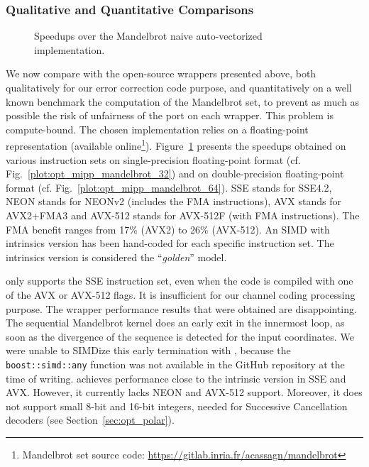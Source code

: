\subsubsection{Qualitative and Quantitative Comparisons}

\begin{figure}[htp]
  \centering
  \quad
  \caption{Speedups over the Mandelbrot naive auto-vectorized implementation.}
  \label{plot:opt_mipp_mandelbrot}
\end{figure}

We now compare \MIPP with the open-source wrappers presented above, both
qualitatively for our error correction code purpose, and quantitatively on a
well known benchmark the computation of the Mandelbrot set, to prevent as much
as possible the risk of unfairness of the port on each wrapper. This problem is
compute-bound. The chosen implementation relies on a floating-point
representation (available online\footnote{Mandelbrot set source code:
\url{https://gitlab.inria.fr/acassagn/mandelbrot}}).
Figure~\ref{plot:opt_mipp_mandelbrot} presents the speedups obtained on various
instruction sets on single-precision floating-point format (cf.
Fig.~\ref{plot:opt_mipp_mandelbrot_32}) and on double-precision floating-point
format (cf. Fig.~\ref{plot:opt_mipp_mandelbrot_64}). SSE stands for SSE4.2, NEON
stands for NEONv2 (includes the FMA instructions), AVX stands for AVX2+FMA3 and
AVX-512 stands for AVX-512F (with FMA instructions). The FMA benefit ranges from
17\% (AVX2) to 26\% (AVX-512). An SIMD with intrinsics version has been
hand-coded for each specific instruction set. The intrinsics version is
considered the ``\emph{golden}'' model.

\textbf{\BoostSIMD} only supports the SSE instruction set, even when the code is
compiled with one of the AVX or AVX-512 flags. It is insufficient for our
channel coding processing purpose. The \BoostSIMD wrapper performance results
that were obtained are disappointing. The sequential Mandelbrot kernel does an
early exit in the innermost loop, as soon as the divergence of the sequence is
detected for the input coordinates. We were unable to SIMDize this early
termination with \BoostSIMD, because the \verb|boost::simd::any| function was
not available in the GitHub repository at the time of writing. \textbf{\xsimd}
achieves performance close to the intrinsic version in SSE and AVX. However, it
currently lacks NEON and AVX-512 support. Moreover, it does not support small
8-bit and 16-bit integers, needed for Successive Cancellation decoders (see
Section~\ref{sec:opt_polar}).

